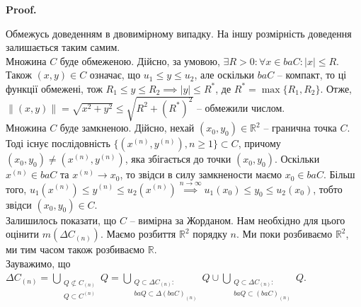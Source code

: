 \documentclass[a4paper, 10pt]{article}
\makeatletter
\def\qed{$\blacksquare$}
\theoremstyle{theoremdd}
\theoremstyle{theoremdd}
\theoremstyle{theoremdd}
\theoremstyle{theoremdd}
\theoremstyle{theoremdd}
\theoremstyle{theoremdd}
\theoremstyle{theoremdd}
\theoremstyle{theoremdd}
\theoremstyle{theoremdd}
\theoremstyle{theoremdd}
\theoremstyle{theoremdd}
\theoremstyle{theoremdd}
\theoremstyle{theoremdd}
\theoremstyle{theoremdd}
\theoremstyle{theoremdd}
\renewenvironment{proof}[1][Proof.\\]{\par
\pushQED{\hfill \qed}%
\normalfont \topsep6\p@\@plus6\p@\relax
\trivlist
\item\relax
{\bfseries
#1\@addpunct{.}}\hspace\labelsep\ignorespaces
}{%
\popQED\endtrivlist\@endpefalse
}
\makeatother
\begin{document}
\begin{proof}
Обмежусь доведенням в двовимірному випадку. На іншу розмірність доведення залишається таким самим.\\
Множина $C$ буде обмеженою. Дійсно, за умовою, $\exists R > 0: \forall x \in baC: |x| \leq R$. Також $(x,y) \in C$ означає, що $u_1 \leq y \leq u_2$, але оскільки $baC$ -- компакт, то ці функції обмежені, тож $R_1 \leq y \leq R_2 \implies |y| \leq R^*$, де $R^* = \max\{R_1,R_2\}$. Отже, $\|(x,y)\| = \sqrt{x^2+y^2} \leq \sqrt{R^2 + (R^*)^2}$ -- обмежили числом.
\bigskip \\
Множина $C$ буде замкненою. Дійсно, нехай $(x_0,y_0) \in \mathbb{R}^2$ -- гранична точка $C$. Тоді існує послідовність $\{(x^{(n)},y^{(n)}), n \geq 1\} \subset C$, причому $(x_0,y_0) \neq (x^{(n)},y^{(n)})$, яка збігається до точки $(x_0,y_0)$. Оскільки $x^{(n)} \in baC$ та $x^{(n)} \to x_0$, то звідси в силу замкнености маємо $x_0 \in baC$. Більш того, $u_1(x^{(n)}) \leq y^{(n)} \leq u_2(x^{(n)}) \overset{n \to \infty}{\implies} u_1(x_0) \leq y_0 \leq u_2(x_0)$, тобто звідси $(x_0,y_0) \in C$.
\bigskip \\
Залишилось показати, що $C$ -- вимірна за Жорданом. Нам необхідно для цього оцінити $m(\Delta C_{(n)})$. Маємо розбиття $\mathbb{R}^2$ порядку $n$. Ми поки розбиваємо $\mathbb{R}^2$, ми тим часом також розбиваємо $\mathbb{R}$.\\
Зауважимо, що\\
$\Delta C_{(n)} = \displaystyle\bigcup_{\substack{Q \not\subset C_{(n)} \\ Q \subset C^{(n)}}} Q = \bigcup_{\substack{Q \subset \Delta C_{(n)}: \\ baQ \subset \Delta (baC)_{(n)} }} Q \cup \bigcup_{\substack{Q \subset \Delta C_{(n)}: \\ baQ \subset (baC)_{(n)} }} Q$.
\begin{figure}[H]
\centering
{}
\end{figure}
\end{proof}
\end{document}
